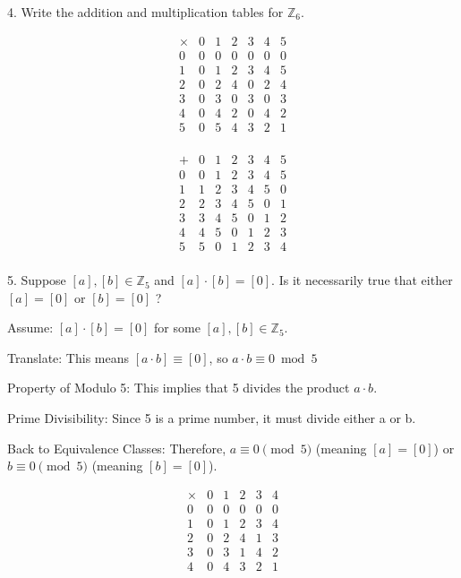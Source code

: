 \documentclass{idrisMemo}
\begin{document}
\begin{prooflist}{4. Write the addition and multiplication tables for $\mathbb{Z}_6$.}
 \item \[
\begin{array}{c|cccccc}
\times & 0 & 1 & 2 & 3 & 4 & 5 \\
\hline
0 & 0 & 0 & 0 & 0 & 0 & 0 \\
1 & 0 & 1 & 2 & 3 & 4 & 5 \\
2 & 0 & 2 & 4 & 0 & 2 & 4 \\
3 & 0 & 3 & 0 & 3 & 0 & 3 \\
4 & 0 & 4 & 2 & 0 & 4 & 2 \\
5 & 0 & 5 & 4 & 3 & 2 & 1 \\
\end{array}
\]
\item \[
\begin{array}{c|cccccc}
+ & 0 & 1 & 2 & 3 & 4 & 5 \\
\hline
0 & 0 & 1 & 2 & 3 & 4 & 5 \\
1 & 1 & 2 & 3 & 4 & 5 & 0 \\
2 & 2 & 3 & 4 & 5 & 0 & 1 \\
3 & 3 & 4 & 5 & 0 & 1 & 2 \\
4 & 4 & 5 & 0 & 1 & 2 & 3 \\
5 & 5 & 0 & 1 & 2 & 3 & 4 \\
\end{array}
\]
\end{prooflist}

\begin{prooflist}{5. Suppose $[a],[b] \in \mathbb{Z}_5$ and $[a] \cdot[b]=[0]$.
    Is it necessarily true that either $[a]=[0]$ or $[b]=[0]$ ?}
\item Assume: $[a]\cdot[b]=[0]$ for some $[a],[b]\in\mathbb{Z}_5$.
\item Translate: This means $[a\cdot b]\equiv[0]$, so $a\cdot b\equiv 0\bmod 5$
\item Property of Modulo 5: This implies that 5 divides the product $a\cdot b$.
\item Prime Divisibility: Since 5 is a prime number, it must divide either a or b.
\item Back to Equivalence Classes: Therefore, $a \equiv 0 \pmod 5$ (meaning
$[a]=[0]$) or $b \equiv 0 \pmod 5$ (meaning $[b]=[0]$).
\item \[
\begin{array}{c|ccccc}
\times & 0 & 1 & 2 & 3 & 4 \\
\hline
0 & 0 & 0 & 0 & 0 & 0 \\
1 & 0 & 1 & 2 & 3 & 4 \\
2 & 0 & 2 & 4 & 1 & 3 \\
3 & 0 & 3 & 1 & 4 & 2 \\
4 & 0 & 4 & 3 & 2 & 1 \\
\end{array}
\]
\end{prooflist}
\end{document}

